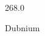 \documentclass[12pt]{article}
\begin{document}
\hfill{}
\vfill
\begin{center}
  {\fontsize{50}{60}
  }

  \vspace{1em}

  268.0

Dubnium
\end{center}
\vfill
\end{document}
